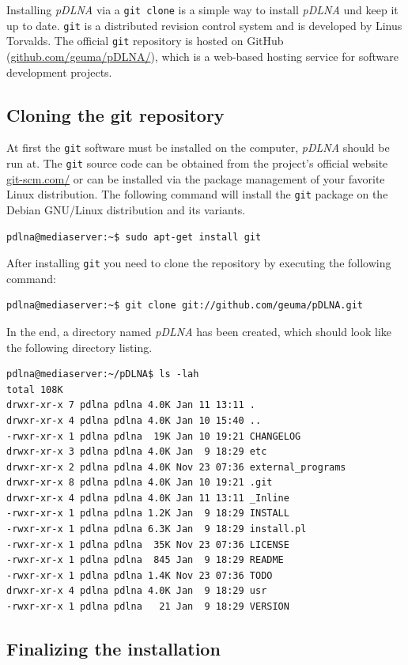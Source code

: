 \documentclass[a4paper,oneside,10pt]{report}
\begin{document}
Installing {\em pDLNA} via a \verb|git clone| is a simple way to install {\em pDLNA} und keep it up to date. \verb|git| is a distributed revision control system and is developed by Linus Torvalds. The official \verb|git| repository is hosted on GitHub (\url{github.com/geuma/pDLNA/}), which is a web-based hosting service for software development projects.

\subsection{Cloning the git repository}

At first the \verb|git| software must be installed on the computer, {\em pDLNA} should be run at. The \verb|git| source code can be obtained from the project's official website \url{git-scm.com/} or can be installed via the package management of your favorite Linux distribution. The following command will install the \verb|git| package on the Debian GNU/Linux distribution and its variants.
\begin{lstlisting}
pdlna@mediaserver:~$ sudo apt-get install git
\end{lstlisting}

After installing \verb|git| you need to clone the repository by executing the following command:
\begin{lstlisting}
pdlna@mediaserver:~$ git clone git://github.com/geuma/pDLNA.git
\end{lstlisting}
In the end, a directory named {\em pDLNA} has been created, which should look like the following directory listing.
\begin{lstlisting}
pdlna@mediaserver:~/pDLNA$ ls -lah
total 108K
drwxr-xr-x 7 pdlna pdlna 4.0K Jan 11 13:11 .
drwxr-xr-x 4 pdlna pdlna 4.0K Jan 10 15:40 ..
-rwxr-xr-x 1 pdlna pdlna  19K Jan 10 19:21 CHANGELOG
drwxr-xr-x 3 pdlna pdlna 4.0K Jan  9 18:29 etc
drwxr-xr-x 2 pdlna pdlna 4.0K Nov 23 07:36 external_programs
drwxr-xr-x 8 pdlna pdlna 4.0K Jan 10 19:21 .git
drwxr-xr-x 4 pdlna pdlna 4.0K Jan 11 13:11 _Inline
-rwxr-xr-x 1 pdlna pdlna 1.2K Jan  9 18:29 INSTALL
-rwxr-xr-x 1 pdlna pdlna 6.3K Jan  9 18:29 install.pl
-rwxr-xr-x 1 pdlna pdlna  35K Nov 23 07:36 LICENSE
-rwxr-xr-x 1 pdlna pdlna  845 Jan  9 18:29 README
-rwxr-xr-x 1 pdlna pdlna 1.4K Nov 23 07:36 TODO
drwxr-xr-x 4 pdlna pdlna 4.0K Jan  9 18:29 usr
-rwxr-xr-x 1 pdlna pdlna   21 Jan  9 18:29 VERSION
\end{lstlisting}

\subsection{Finalizing the installation}
\end{document}
